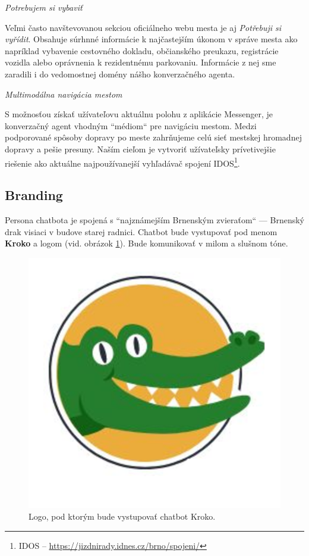 \documentclass{ExcelAtFIT}
\begin{document}
\vspace{2mm}
\textit{Potrebujem si vybaviť}

\noindent Veľmi často navštevovanou sekciou oficiálneho webu mesta je aj \emph{Potřebuji si vyřídit}. Obsahuje súrhnné informácie k najčastejším úkonom v správe mesta ako napríklad vybavenie cestovného dokladu, občianského preukazu, registrácie vozidla alebo oprávnenia k rezidentnému parkovaniu. Informácie z nej sme zaradili i do vedomostnej domény nášho konverzačného agenta.


\textit{Multimodálna navigácia mestom}

\noindent S možnosťou získať užívateľovu aktuálnu polohu z aplikácie Messenger, je konverzačný agent vhodným ``médiom`` pre navigáciu mestom. Medzi podporované spôsoby dopravy po meste zahrňujeme celú sieť mestskej hromadnej dopravy a pešie presuny. Naším cieľom je vytvoriť užívateľsky prívetivejšie riešenie ako aktuálne najpoužívanejší vyhľadávač spojení IDOS\footnote{IDOS -- \url{https://jizdnirady.idnes.cz/brno/spojeni/}}.

\subsection{Branding}
Persona chatbota je spojená s ``najznámejším Brnenským zvieraťom`` --- Brnenský drak visiaci v budove starej radnici. Chatbot bude vystupovať pod menom \textbf{Kroko} a logom (vid. obrázok \ref{kroko}). Bude komunikovať v milom a slušnom tóne.

\begin{figure}[h]
	\centering
	\includegraphics[width=0.5\linewidth]{resized2.png}
	\caption{Logo, pod ktorým bude vystupovať chatbot Kroko.}
	\label{kroko}
\end{figure}
\end{document}
